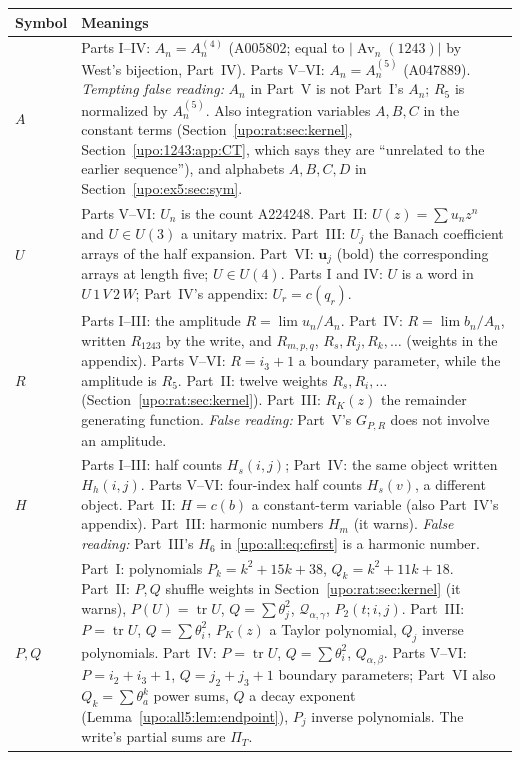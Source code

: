 \documentclass[11pt,letterpaper]{article}
\theoremstyle{remark}\newtheorem{remark}[theorem]{Remark}
\numberwithin{equation}{section}
\newcommand{\Av}{\operatorname{Av}}
\newcommand{\tr}{\operatorname{tr}}
\newcommand{\bfU}{\boldsymbol u}
\begin{document}
\begin{longtable}{@{}>{\raggedright\arraybackslash}p{} >{\raggedright\arraybackslash}p{}@{}}
\toprule
Symbol & Meanings\\
\midrule
\endhead
$A$ & Parts I--IV: $A_n=A^{(4)}_n$ (A005802; equal to $|\Av_n(1243)|$ by West's bijection, Part~IV). Parts V--VI: $A_n=A^{(5)}_n$ (A047889). \emph{Tempting false reading:} $A_n$ in Part~V is not Part~I's $A_n$; $R_5$ is normalized by $A^{(5)}_n$. Also integration variables $A,B,C$ in the constant terms (Section~\ref{upo:rat:sec:kernel}, Section~\ref{upo:1243:app:CT}, which says they are ``unrelated to the earlier sequence''), and alphabets $A,B,C,D$ in Section~\ref{upo:ex5:sec:sym}.\\
$U$ & Parts V--VI: $U_n$ is the count A224248. Part~II: $U(z)=\sum u_nz^n$ and $U\in U(3)$ a unitary matrix. Part~III: $U_j$ the Banach coefficient arrays of the half expansion. Part~VI: $\bfU_j$ (bold) the corresponding arrays at length five; $U\in U(4)$. Parts I and IV: $U$ is a word in $U\,1\,V\,2\,W$; Part~IV's appendix: $U_r=c(q_r)$.\\
$R$ & Parts I--III: the amplitude $R=\lim u_n/A_n$. Part~IV: $R=\lim b_n/A_n$, written $R_{1243}$ by the write, and $R_{m,p,q}$, $R_s,R_j,R_k,\ldots$ (weights in the appendix). Parts V--VI: $R=i_3+1$ a boundary parameter, while the amplitude is $R_5$. Part~II: twelve weights $R_s,R_i,\ldots$ (Section~\ref{upo:rat:sec:kernel}). Part~III: $R_K(z)$ the remainder generating function. \emph{False reading:} Part~V's $G_{P,R}$ does not involve an amplitude.\\
$H$ & Parts I--III: half counts $H_s(i,j)$; Part~IV: the same object written $H_h(i,j)$. Parts V--VI: four-index half counts $H_s(v)$, a different object. Part~II: $H=c(b)$ a constant-term variable (also Part~IV's appendix). Part~III: harmonic numbers $H_m$ (it warns). \emph{False reading:} Part~III's $H_6$ in \eqref{upo:all:eq:cfirst} is a harmonic number.\\
$P,Q$ & Part~I: polynomials $P_k=k^2+15k+38$, $Q_k=k^2+11k+18$. Part~II: $P,Q$ shuffle weights in Section~\ref{upo:rat:sec:kernel} (it warns), $P(U)=\tr U$, $Q=\sum\theta_j^2$, $\mathcal Q_{\alpha,\gamma}$, $P_2(t;i,j)$. Part~III: $P=\tr U$, $Q=\sum\theta_i^2$, $P_K(z)$ a Taylor polynomial, $Q_j$ inverse polynomials. Part~IV: $P=\tr U$, $Q=\sum\theta_i^2$, $Q_{\alpha,\beta}$. Parts V--VI: $P=i_2+i_3+1$, $Q=j_2+j_3+1$ boundary parameters; Part~VI also $Q_k=\sum\theta_a^k$ power sums, $Q$ a decay exponent (Lemma~\ref{upo:all5:lem:endpoint}), $P_j$ inverse polynomials. The write's partial sums are $\Pi_T$.\\

\end{longtable}
\end{document}
